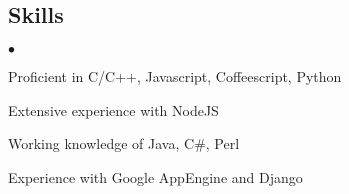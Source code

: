 \documentclass[margin,line]{res}
\newenvironment{list2}{
  \begin{list}{$\bullet$}{%
      \setlength{\itemsep}{0in}
      \setlength{\parsep}{0in} \setlength{\parskip}{0in}
      \setlength{\topsep}{0in} \setlength{\partopsep}{0in}
      \setlength{\leftmargin}{0.2in}}}{\end{list}}
\begin{document}
\begin{resume}
\section{\sc Skills}
\begin{list2}
\item Proficient in C/C++, Javascript, Coffeescript, Python
\item Extensive experience with NodeJS
\item Working knowledge of Java, C\#, Perl
\item Experience with Google AppEngine and Django
\end{list2}

\end{resume}
\end{document}

